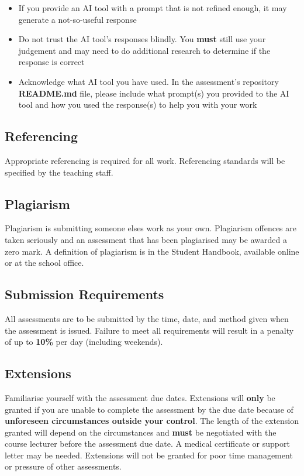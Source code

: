 \documentclass{article}
\begin{document}
\begin{itemize}
    \item If you provide an AI tool with a prompt that is not refined enough, it may generate a not-so-useful response
    \item Do not trust the AI tool's responses blindly. You \textbf{must} still use your judgement and may need to do additional research to determine if the response is correct
    \item Acknowledge what AI tool you have used. In the assessment's repository \textbf{README.md} file, please include what prompt(s) you provided to the AI tool and how you used the response(s) to help you with your work
\end{itemize}

\subsection*{Referencing}
Appropriate referencing is required for all work. Referencing standards will be specified by the teaching staff.

\subsection*{Plagiarism}
Plagiarism is submitting someone elses work as your own. Plagiarism offences are taken seriously and an assessment that has been plagiarised may be awarded a zero mark. A definition of plagiarism is in the Student Handbook, available online or at the school office.

\subsection*{Submission Requirements}
All assessments are to be submitted by the time, date, and method given when the assessment is issued. Failure to meet all requirements will result in a penalty of up to \textbf{10\%} per day (including weekends).

\subsection*{Extensions}
Familiarise yourself with the assessment due dates. Extensions will \textbf{only} be granted if you are unable to complete the assessment by the due date because of \textbf{unforeseen circumstances outside your control}. The length of the extension granted will depend on the circumstances and \textbf{must} be negotiated with the course lecturer before the assessment due date. A medical certificate or support letter may be needed. Extensions will not be granted for poor time management or pressure of other assessments.
\end{document}
